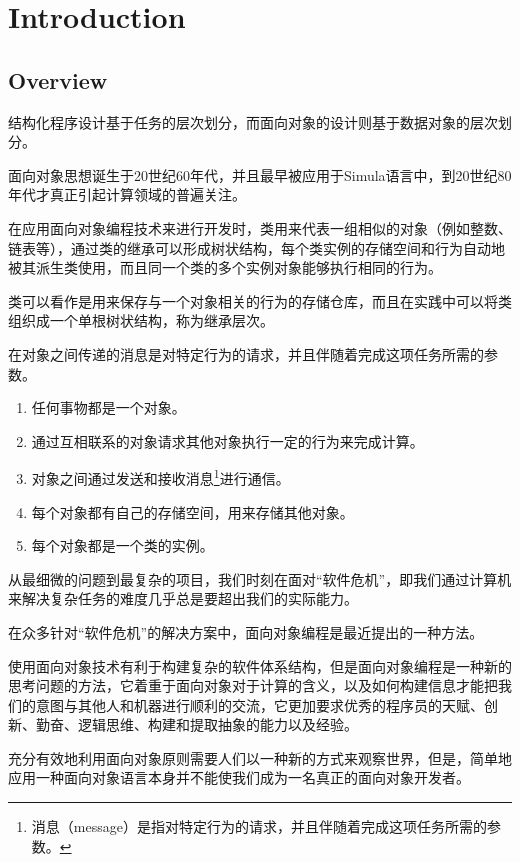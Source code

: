 \part{Introduction}


\chapter{Overview}

\begin{oopquote}
结构化程序设计基于任务的层次划分，而面向对象的设计则基于数据对象的层次划分。
\end{oopquote}

面向对象思想\cite{oop}诞生于20世纪60年代，并且最早被应用于Simula语言中，到20世纪80年代才真正引起计算领域的普遍关注。

在应用面向对象编程技术来进行开发时，类用来代表一组相似的对象（例如整数、链表等），通过类的继承可以形成树状结构，每个类实例的存储空间和行为自动地被其派生类使用，而且同一个类的多个实例对象能够执行相同的行为。

类可以看作是用来保存与一个对象相关的行为的存储仓库，而且在实践中可以将类组织成一个单根树状结构，称为继承层次。

在对象之间传递的消息是对特定行为的请求，并且伴随着完成这项任务所需的参数。

\begin{enumerate}
\item 任何事物都是一个对象。
\item 通过互相联系的对象请求其他对象执行一定的行为来完成计算。
\item 对象之间通过发送和接收消息\footnote{消息（message）是指对特定行为的请求，并且伴随着完成这项任务所需的参数。}进行通信。
\item 每个对象都有自己的存储空间，用来存储其他对象。
\item 每个对象都是一个类的实例。
\end{enumerate}


从最细微的问题到最复杂的项目，我们时刻在面对“软件危机”，即我们通过计算机来解决复杂任务的难度几乎总是要超出我们的实际能力。

在众多针对“软件危机”的解决方案中，面向对象编程是最近提出的一种方法。

使用面向对象技术有利于构建复杂的软件体系结构，但是面向对象编程是一种新的思考问题的方法，它着重于面向对象对于计算的含义，以及如何构建信息才能把我们的意图与其他人和机器进行顺利的交流，它更加要求优秀的程序员的天赋、创新、勤奋、逻辑思维、构建和提取抽象的能力以及经验。

充分有效地利用面向对象原则需要人们以一种新的方式来观察世界，但是，简单地应用一种面向对象语言本身并不能使我们成为一名真正的面向对象开发者。

